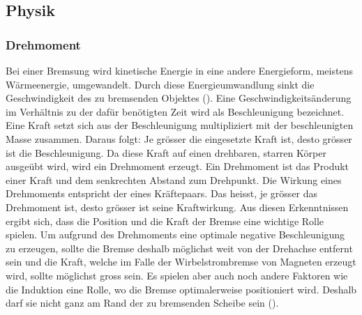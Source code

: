\subsection{Physik}\label{cap:einlesung_physik}
\subsubsection{Drehmoment}
Bei einer Bremsung wird kinetische Energie in eine andere Energieform, meistens Wärmeenergie, umgewandelt. Durch diese Energieumwandlung sinkt die Geschwindigkeit des zu bremsenden Objektes (\cite{drehmoment}).
\newpara
Eine Geschwindigkeitsänderung im Verhältnis zu der dafür benötigten Zeit wird als Beschleunigung bezeichnet. 
\newpara
Eine Kraft setzt sich aus der Beschleunigung multipliziert mit der beschleunigten Masse zusammen. Daraus folgt: Je grösser die eingesetzte Kraft ist, desto grösser ist die Beschleunigung.
Da diese Kraft auf einen drehbaren, starren Körper ausgeübt wird, wird ein Drehmoment erzeugt. Ein Drehmoment ist das Produkt einer Kraft und dem senkrechten Abstand zum Drehpunkt. Die Wirkung eines Drehmoments entspricht der eines Kräftepaars. Das heisst, je grösser das Drehmoment ist, desto grösser ist seine Kraftwirkung.
\newpara
Aus diesen Erkenntnissen ergibt sich, dass die Position und die Kraft der Bremse eine wichtige Rolle spielen. Um aufgrund des Drehmoments eine optimale negative Beschleunigung zu erzeugen, sollte die Bremse deshalb möglichst weit von der Drehachse entfernt sein und die Kraft, welche im Falle der Wirbelstrombremse von Magneten erzeugt wird, sollte möglichst gross sein. Es spielen aber auch noch andere Faktoren wie die Induktion eine Rolle, wo die Bremse optimalerweise positioniert wird. Deshalb darf sie nicht ganz am Rand der zu bremsenden Scheibe sein (\cite{kuchling2014taschenbuch}).